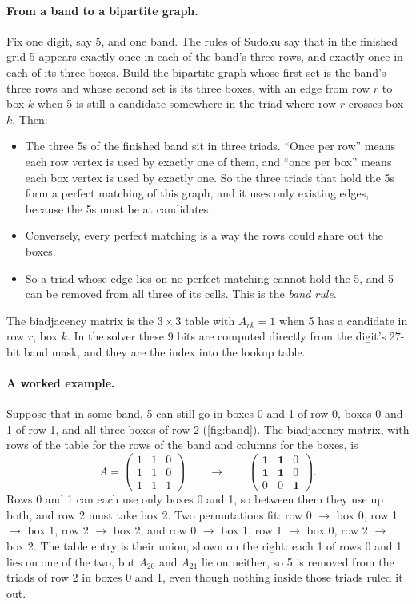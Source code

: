 \paragraph{From a band to a bipartite graph.} Fix one digit, say 5, and one band. The rules of Sudoku say that in the
finished grid 5 appears exactly once in each of the band's three rows, and exactly once in each of its three boxes.
Build the bipartite graph whose first set is the band's three rows and whose second set is its three boxes, with an
edge from row $r$ to box $k$ when 5 is still a candidate somewhere in the triad where row $r$ crosses box $k$. Then:
\begin{itemize}
\item The three 5s of the finished band sit in three triads. ``Once per row'' means each row vertex is used by
  exactly one of them, and ``once per box'' means each box vertex is used by exactly one. So the three triads that
  hold the 5s form a perfect matching of this graph, and it uses only existing edges, because the 5s must be at
  candidates.
\item Conversely, every perfect matching is a way the rows could share out the boxes.
\item So a triad whose edge lies on no perfect matching cannot hold the 5, and 5 can be removed from all three of its
  cells. This is the \emph{band rule}.
\end{itemize}
The biadjacency matrix is the $3\times 3$ table with $A_{rk}=1$ when 5 has a candidate in row $r$, box $k$. In the solver
these 9 bits are computed directly from the digit's 27-bit band mask, and they are the index into the lookup table.

\paragraph{A worked example.} Suppose that in some band, 5 can still go in boxes 0 and 1 of row 0, boxes 0 and 1 of
row 1, and all three boxes of row 2 (\cref{fig:band}). The biadjacency matrix, with rows of the table for the rows of
the band and columns for the boxes, is
\[
A = \begin{pmatrix} 1 & 1 & 0 \\ 1 & 1 & 0 \\ 1 & 1 & 1 \end{pmatrix}
\qquad\longrightarrow\qquad
\begin{pmatrix} \mathbf{1} & \mathbf{1} & 0 \\ \mathbf{1} & \mathbf{1} & 0 \\ 0 & 0 & \mathbf{1} \end{pmatrix}.
\]
Rows 0 and 1 can each use only boxes 0 and 1, so between them they use up both, and row 2 must take box 2. Two
permutations fit: row 0 $\to$ box 0, row 1 $\to$ box 1, row 2 $\to$ box 2, and row 0 $\to$ box 1, row 1 $\to$ box 0,
row 2 $\to$ box 2. The table entry is their union, shown on the right: each 1 of rows 0 and 1 lies on one of the two,
but $A_{20}$ and $A_{21}$ lie on neither, so 5 is removed from the triads of row 2 in boxes 0 and 1, even though
nothing inside those triads ruled it out.

